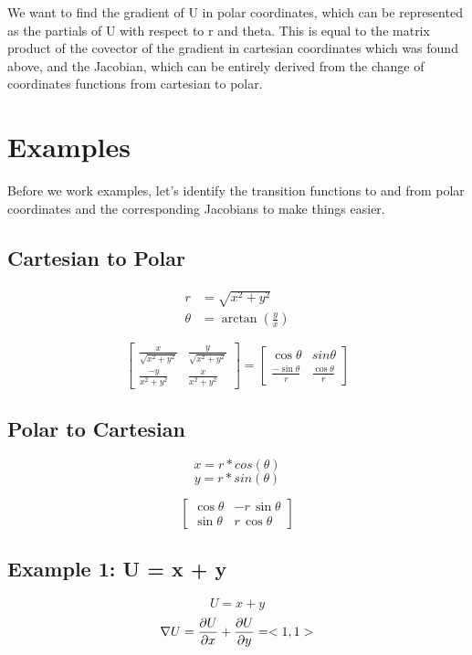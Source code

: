 \documentclass{article}
\begin{document}
We want to find the gradient of U in polar coordinates, which can be represented as the partials of U with respect to r and theta. This is equal to the matrix product of the covector of the gradient in cartesian coordinates which was found above, and the Jacobian, which can be entirely derived from the change of coordinates functions from cartesian to polar.

\section{Examples}

Before we work examples, let's identify the transition functions to and from polar coordinates and the corresponding Jacobians to make things easier.

\subsection{Cartesian to Polar}


\begin{align}
r &= \sqrt{x^2 + y^2} \\
\theta &= \arctan{\left(\frac{y}{x}\right)} 
\end{align}

\begin{equation}
\begin{bmatrix}
\frac{x}{\sqrt{x^2 + y^2}} & \frac{y}{\sqrt{x^2 + y^2}} \\
\frac{-y}{x^2 + y^2}       & \frac{x}{x^2+y^2}          
\end{bmatrix}
=
\begin{bmatrix}
\cos\theta & sin\theta  \\
\frac{-\sin\theta}{r} &  \frac{\cos\theta}{r}
\end{bmatrix}
\end{equation}

\subsection{Polar to Cartesian}
\[ x = r * cos(\theta) \]
\[ y = r * sin (\theta)\]

\begin{equation}
\begin{bmatrix}
\cos\theta & -r\,\sin\theta  \\
\sin\theta &  r\,\cos\theta
\end{bmatrix} 
\end{equation}

\subsection{Example 1: U = x + y}
\[ U = x + y\]
\[\nabla U = \pdv{U}{x} + \pdv{U}{y} = <1,1>  \]
\end{document}
